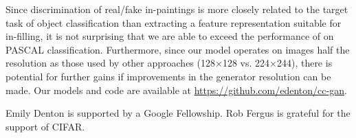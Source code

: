\documentclass{article} %
\begin{document}
Since discrimination of real/fake in-paintings is more closely related
to the target task of object classification than extracting a feature
representation suitable for in-filling, it is not surprising that we
are able to exceed the performance of \cite{pathak2016}
on PASCAL classification.  Furthermore, since our model operates on
images half the resolution as those used by other approaches
(128$\times$128 vs. 224$\times$244), there is potential for further
gains if improvements in the generator resolution can be made. Our models and code are available at \url{https://github.com/edenton/cc-gan}.


 Emily Denton is supported by a
Google Fellowship. Rob Fergus is grateful for the support of CIFAR.

\small
 

\end{document}
